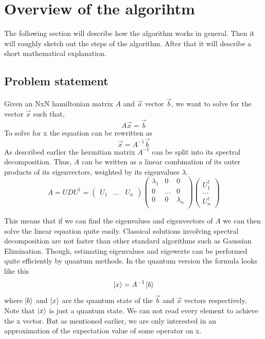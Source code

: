 \section{ Overview of the algorihtm }
The following section will describe how the algorithm works in general.
Then it will roughly sketch out the steps of the algorithm.
After that it will describe a short mathematical explanation. 
\subsection{Problem statement}

Given an NxN hamiltonian matrix $A$ and $\vec a$ vector $\vec b$, we want to solve for the vector $\vec x$ such that,
\begin{equation}
A \vec{x} = \vec{b}
\end{equation}
To solve for x the equation can be rewritten as
\begin{equation}
\vec{x} = A^{-1}\vec{b}
\end{equation}
As described earlier the hermitian matrix $A^{-1}$ can be split into its spectral decomposition. 
Thus, $A$ can be written as a linear combination of its outer products of its eigenvectors, weighted by its eigenvalues $\lambda$.
\begin{equation}
A =  U D U^{\dagger} =
\begin{pmatrix} U_1 & ...& U_n \end{pmatrix}
\begin{pmatrix} \lambda_1 & 0 & 0 \\  0 & \dots & 0\\ 0 & 0& \lambda_n \\ \end{pmatrix}
\begin{pmatrix} U^\dagger_1 \\ ...\\ U^\dagger_n \end{pmatrix}
\end{equation}

This means that if we can find the eigenvalues and eigenvectors of $A$ we can then solve the linear equation quite easily. 
Classical solutions involving spectral decomposition are not faster than other standard algorithms such as Gaussian Elimination. 
Though, estimating eigenvalues and eigewerte can be performed quite efficiently by quantum methods.
In the quantum version the formula looks like this
\begin{equation}
\ket{x} = A^{-1}\ket{b}
\end{equation}
where $\ket b$ and $\ket x$ are the quantum state of the $\vec b$ and $\vec x$ vectors respectively.
Note that  $\ket x$ is just a quantum state. We can not read every element to achieve the x vector. But as mentioned earlier, we are only interested in an approximation of the expectation value of some operator on x.

